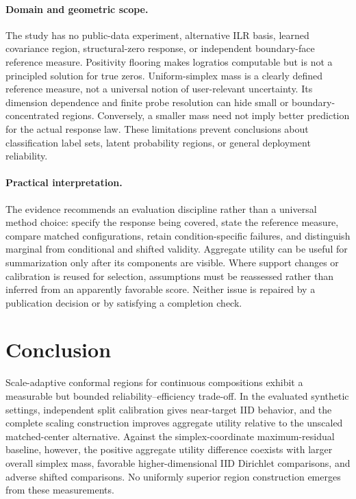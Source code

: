 \documentclass{article}
\begin{document}
\paragraph{Domain and geometric scope.}
The study has no public-data experiment, alternative ILR basis, learned covariance region, structural-zero response, or independent boundary-face reference measure. Positivity flooring makes logratios computable but is not a principled solution for true zeros. Uniform-simplex mass is a clearly defined reference measure, not a universal notion of user-relevant uncertainty. Its dimension dependence and finite probe resolution can hide small or boundary-concentrated regions. Conversely, a smaller mass need not imply better prediction for the actual response law. These limitations prevent conclusions about classification label sets, latent probability regions, or general deployment reliability.

\paragraph{Practical interpretation.}
The evidence recommends an evaluation discipline rather than a universal method choice: specify the response being covered, state the reference measure, compare matched configurations, retain condition-specific failures, and distinguish marginal from conditional and shifted validity. Aggregate utility can be useful for summarization only after its components are visible. Where support changes or calibration is reused for selection, assumptions must be reassessed rather than inferred from an apparently favorable score. Neither issue is repaired by a publication decision or by satisfying a completion check.

\section{Conclusion}
Scale-adaptive conformal regions for continuous compositions exhibit a measurable but bounded reliability--efficiency trade-off. In the evaluated synthetic settings, independent split calibration gives near-target IID behavior, and the complete scaling construction improves aggregate utility relative to the unscaled matched-center alternative. Against the simplex-coordinate maximum-residual baseline, however, the positive aggregate utility difference coexists with larger overall simplex mass, favorable higher-dimensional IID Dirichlet comparisons, and adverse shifted comparisons. No uniformly superior region construction emerges from these measurements.
\end{document}
